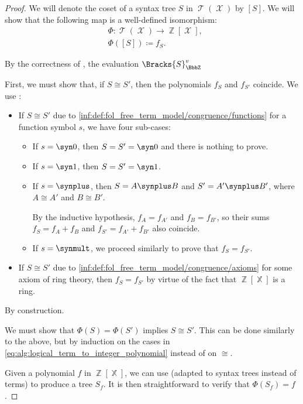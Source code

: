 \begin{proof}
  We will denote the coset of a syntax tree \( S \) in \( \mscrT(\mscrX) \) by \( [S] \). We will show that the following map is a well-defined isomorphism:
  \begin{equation*}
    \begin{aligned}
      &\Phi: \mscrT(\mscrX) \to \BbbZ[\mscrX], \\
      &\Phi([S]) \coloneqq f_S.
    \end{aligned}
  \end{equation*}

   By the correctness of , the evaluation \( \Bracks{ S }_{\BbbZ}^v \)

  First, we must show that, if \( S \cong S' \), then the polynomials \( f_S \) and \( f_{S'} \) coincide. We use :
  \begin{itemize}
    \item If \( S \cong S' \) due to \ref{inf:def:fol_free_term_model/congruence/functions} for a function symbol \( s \), we have four sub-cases:
    \begin{itemize}
      \item If \( s = \syn0 \), then \( S = S' = \syn0 \) and there is nothing to prove.
      \item If \( s = \syn1 \), then \( S = S' = \syn1 \).
      \item If \( s = {\synplus} \), then \( S = A \synplus B \) and \( S' = A' \synplus B' \), where \( A \cong A' \) and \( B \cong B' \).

      By the inductive hypothesis, \( f_A = f_{A'} \) and \( f_B = f_{B'} \), so their sums \( f_S = f_A + f_B \) and \( f_{S'} = f_{A'} + f_{B'} \) also coincide.

      \item If \( s = {\synmult} \), we proceed similarly to prove that \( f_S = f_{S'} \).
    \end{itemize}

    \item If \( S \cong S' \) due to \ref{inf:def:fol_free_term_model/congruence/axioms} for some axiom of ring theory, then \( f_S = f_{S'} \) by virtue of the fact that \( \BbbZ[\BbbX] \) is a ring.
  \end{itemize}

   By construction.

   We must show that \( \Phi(S) = \Phi(S') \) implies \( S \cong S' \). This can be done similarly to the above, but by induction on the cases in \eqref{eq:alg:logical_term_to_integer_polynomial} instead of on \( {\cong} \).

   Given a polynomial \( f \) in \( \BbbZ[\BbbX] \), we can use  (adapted to syntax trees instead of terms) to produce a tree \( S_f \). It is then straightforward to verify that \( \Phi(S_f) = f \).
\end{proof}

